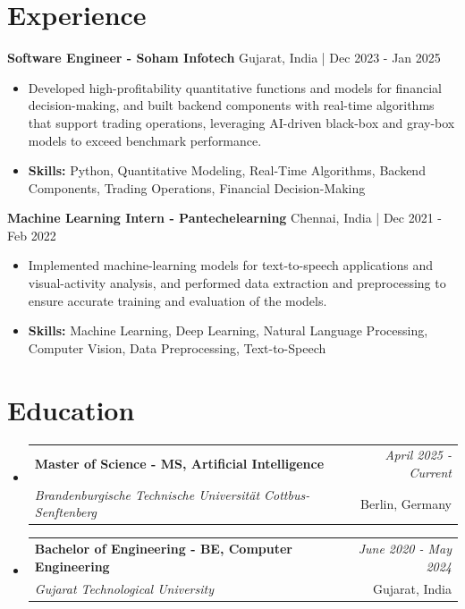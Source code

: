 \documentclass[a4paper,11pt]{article}
\makeatletter
\newcommand{\resumeSubheading}[4]{
\vspace{0.5mm}\item
    \begin{tabular*}{\linewidth}[t]{l@{\extracolsep{\fill}}r}
        \textbf{#1} & \textit{\footnotesize{#4}} \\
        \textit{\footnotesize{#3}} &  \footnotesize{#2}\\
    \end{tabular*}
    \vspace{-2.4mm}
}
\makeatother
\begin{document}
\section{\textbf{Experience}}


\vspace{1mm}
  \textbf{Software Engineer - Soham Infotech} \hfill Gujarat, India | Dec 2023 - Jan 2025
\vspace{-1.5mm} %
\begin{itemize}
  \item Developed high-profitability quantitative functions and models for financial decision-making, and built backend components with real-time algorithms that support trading operations, leveraging AI-driven black-box and gray-box models to exceed benchmark performance.

\vspace{-2mm}
  \item \textbf{Skills:} Python, Quantitative Modeling, Real-Time Algorithms, Backend Components, Trading Operations, Financial Decision-Making
\end{itemize}

\vspace{1mm}
  \textbf{Machine Learning Intern - Pantechelearning} \hfill Chennai, India | Dec 2021 - Feb 2022
\vspace{-1.5mm} %
\begin{itemize}
  \item Implemented machine-learning models for text-to-speech applications and visual-activity analysis, and performed data extraction and preprocessing to ensure accurate training and evaluation of the models.
\vspace{-2mm}
  \item \textbf{Skills:} Machine Learning, Deep Learning, Natural Language Processing, Computer Vision, Data Preprocessing, Text-to-Speech
\end{itemize}\section{\textbf{Education}}
\vspace{-0.4mm}

\begin{itemize}[leftmargin=0.15in, label={}]
\resumeSubheading
{Master of Science - MS, Artificial Intelligence }{Berlin, Germany}
{Brandenburgische Technische Universität Cottbus-Senftenberg  }{April 2025 - Current}

\vspace{1.0mm} %
\resumeSubheading
{Bachelor of Engineering - BE, Computer Engineering  }{Gujarat, India}
{Gujarat Technological University }{June 2020 - May 2024}

\end{itemize}
\end{document}

